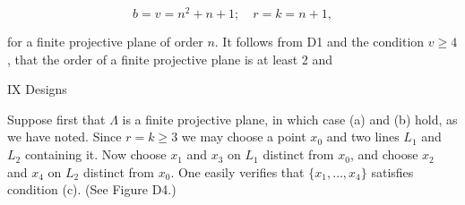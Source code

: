 $$b = v = n^2 + n + 1; \quad r = k = n + 1,$$

for a finite projective plane of order $n$. It follows from D1 and the condition $v \geq 4$, that the order of a finite projective plane is at least 2 and

IX Designs

Suppose first that $\Lambda$ is a finite projective plane, in which case (a) and (b) hold, as we have noted. Since $r = k \geq 3$ we may choose a point $x_0$ and two lines $L_1$ and $L_2$ containing it. Now choose $x_1$ and $x_3$ on $L_1$ distinct from $x_0$, and choose $x_2$ and $x_4$ on $L_2$ distinct from $x_0$. One easily verifies that $\{x_1, \ldots, x_4\}$ satisfies condition (c). (See Figure D4.)
